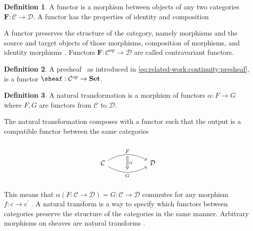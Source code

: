 \documentclass[10pt,journal,compsoc]{IEEEtran}
\theoremstyle{definition}
\newtheorem{definition}{Definition}[section]
\theoremstyle{remark}
\begin{document}
 \begin{definition} A functor is a morphism between objects of any two  categories $\bm{F}: \mathcal{C} \rightarrow \mathcal{D}$. A functor has the properties of identity and composition \cite{riehlCategoryTheoryContext}\end{definition}

A functor preserves the structure of the category, namely morphisms and the source and target objects of those morphisms, composition of morphisms, and identity morphisms \cite{riehlCategoryTheoryContext}. Functors $\bm{F}: \mathcal{C}^{op} \rightarrow \mathcal{D}$ are called contravariant functors.

 \begin{definition} A presheaf \sheafc\, as introduced in \autoref{eq:related-work:continuity:presheaf}, is a functor $\sheaf: \mathcal{C}^{op} \rightarrow \textbf{Set}$.\cite{nlab:presheaf} \end{definition}

 \begin{definition} A natural transformation is a morphism of functors $\alpha: F \rightarrow G$ where $F, G$ are functors from $\mathcal{C}$ to $\mathcal{D}$. \cite{riehlCategoryTheoryContext, bradleyWhatNaturalTransformation}
 \end{definition}

The natural transformation composes with a functor such that the output is a compatible functor between the same categories 
\begin{equation}
  \label{eq:related-work:equivariance:natural-transform}
\begin{tikzcd}
  & {} \arrow[dd, "\alpha", Rightarrow, shorten=1.5em] &             \\
\mathcal{C} \arrow[rr, "F", bend left] \arrow[rr, "G"', bend right] &                                     & \mathcal{D} \\
  & {}                                  &            
\end{tikzcd}
\end{equation}
This means that $\alpha(F: \mathcal{C} \rightarrow \mathcal{D}) = G: \mathcal{C} \rightarrow \mathcal{D}$ commutes for any morphism $f:c\rightarrow c^{\prime}$ \cite{fongInvitationAppliedCategory2019}. A natural transform is a way to specify which functors between categories preserve the structure of the categories in the same manner. Arbitrary morphisms on sheaves are natural transforms \cite{SheafMathematics2021,bradleyWhatNaturalTransformation}. 
\end{document}
